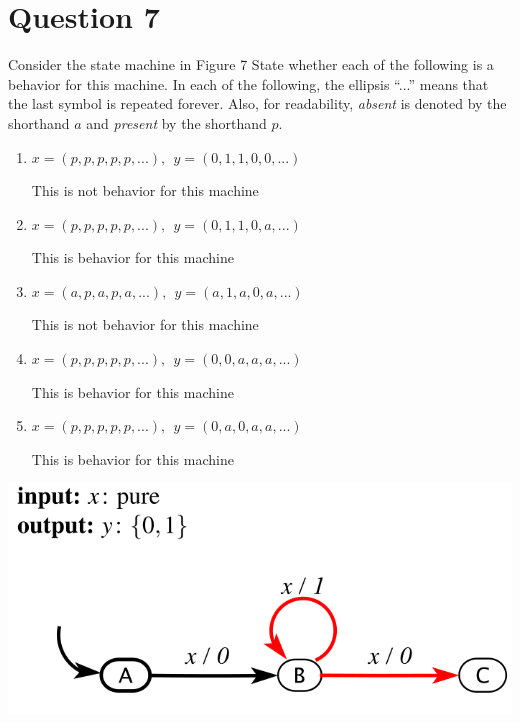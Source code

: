 \documentclass[12pt]{article}
\begin{document}
\vfil
\clearpage




















\section{Question 7}
Consider the state machine in Figure 7 State whether each of the following is
a behavior for this machine. In each of the following, the ellipsis “...” means that
the last symbol is repeated forever. Also, for readability, \textit{absent} is denoted by the
shorthand $a$ and \textit{present} by the shorthand $p$.


\begin{enumerate}
	\item $x=(p,p,p,p,p,...),\ \ y=(0,1,1,0,0,...)$
	\begin{qsolve}[Solution]
		This is not behavior for this machine	
	\end{qsolve}
	
	\item $x=(p,p,p,p,p,...),\ \ y=(0,1,1,0,a,...)$
	\begin{qsolve}[Solution]
		This is behavior for this machine	
	\end{qsolve}
	
	\item $x=(a,p,a,p,a,...),\ \ y=(a,1,a,0,a,...)$
	\begin{qsolve}[Solution]
		This is not behavior for this machine	
	\end{qsolve}
	
	\item $x=(p,p,p,p,p,...),\ \ y=(0,0,a,a,a,...)$
	\begin{qsolve}[Solution]
		This is behavior for this machine	
	\end{qsolve}
	
	\item $x=(p,p,p,p,p,...),\ \ y=(0,a,0,a,a,...)$
	\begin{qsolve}[Solution]
		This is behavior for this machine	
	\end{qsolve}
\end{enumerate}

\centering\includegraphics*[width=0.6\linewidth]{images/img6}
\end{document}
